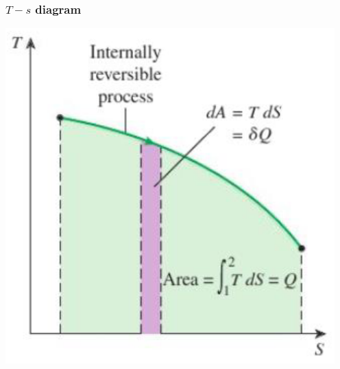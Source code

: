 \documentclass[11pt]{article}
\begin{document}
\subsubsection{\(T-s\) diagram}
\label{sec:org2acc6c4}
\begin{center}
\includegraphics[scale=0.9]{./images/T-s-diagram.png}
\end{center}
\end{document}
